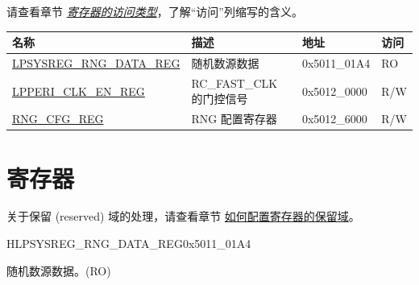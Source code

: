 \documentclass[main\_\_CN.tex]{subfiles}
\begin{document}
请查看章节 \hyperref[glossary-access-types]{\textit{寄存器的访问类型}}，了解“访问”列缩写的含义。

\begin{table}[H]
    \centering
    \begin{tabular}{ | l | l | l | l |  }
    \hline
    \rowcolor{lightgray}
    \textbf{名称} & \textbf{描述} & \textbf{地址} & \textbf{访问} \\
    \hline
    \hyperref[regdesc:LPSYSREGRNGDATAREG]{LPSYSREG\_RNG\_DATA\_REG} & 随机数源数据 & 0x5011\_01A4 & RO \\ \hline
    \hyperref[regdesc:LPPERICLKENREG]{LPPERI\_CLK\_EN\_REG} & RC\_FAST\_CLK 的门控信号 & 0x5012\_0000 & R/W \\ \hline
    \hyperref[regdesc:RNGCFGREG]{RNG\_CFG\_REG} & RNG 配置寄存器 & 0x5012\_6000 & R/W \\ \hline
    \end{tabular}
\end{table}





\newpage
\section{寄存器}


关于保留 (reserved) 域的处理，请查看章节 \hyperref[programming-reserved-field]{如何配置寄存器的保留域}。

\begin{register}{H}{LPSYSREG\_RNG\_DATA\_REG}{0x5011\_01A4}\label{regdesc:LPSYSREGRNGDATAREG}
%
\regnewline%
\begin{regdesc}\begin{reglist}
\label{fielddesc:LPSYSREGRNGDATA}\item [LPSYSREG\_RNG\_DATA] 随机数源数据。(RO)
\end{reglist}\end{regdesc}
\end{register}
\end{document}
